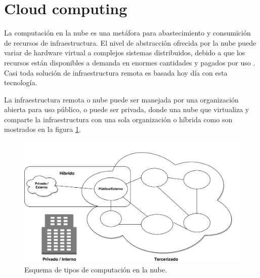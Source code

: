 \section{Cloud computing}
La computación en la nube es una metáfora para abastecimiento y consumición de recursos de infraestructura. El nivel de abstracción ofrecida por la nube puede variar de hardware virtual a complejos sistemas distribuidos, debido a que los recursos están disponibles a demanda en enormes cantidades y pagados por uso \citep{wittig_amazon_2016}. Casi toda solución de infraestructura remota es basada hoy día con esta tecnología.

La infraestructura remota o nube puede ser manejada por una organización abierta para uso público, o puede ser privada, donde una nube que virtualiza y comparte la infraestructura con una sola organización o híbrida como son mostrados en la figura \ref{cloud_types}.

\begin{figure}[H]
\centering
\includegraphics[width=125mm,scale=1]{Figuras/cloud_computing_types}
\caption{Esquema de tipos de computación en la nube.}
  \label{cloud_types}
\end{figure}